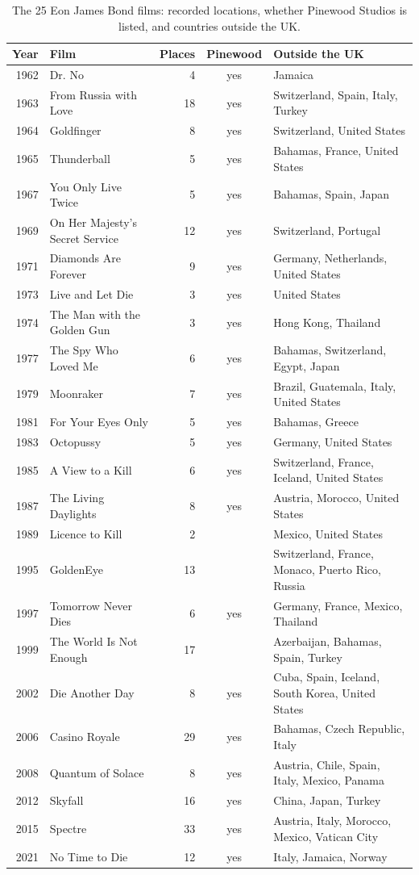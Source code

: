 \documentclass[11pt,a4paper]{article}
\begin{document}
\begin{table}[tbp]\centering\footnotesize\caption{The 25 Eon James Bond films: recorded locations, whether Pinewood Studios is listed, and countries outside the UK.}\label{tab:bond}\begin{tabular}{rlrc>{\raggedright\arraybackslash}p{6.4cm}}\toprule Year & Film & Places & Pinewood & Outside the UK\\\midrule
1962 & Dr. No & 4 & yes & Jamaica\\
1963 & From Russia with Love & 18 & yes & Switzerland, Spain, Italy, Turkey\\
1964 & Goldfinger & 8 & yes & Switzerland, United States\\
1965 & Thunderball & 5 & yes & Bahamas, France, United States\\
1967 & You Only Live Twice & 5 & yes & Bahamas, Spain, Japan\\
1969 & On Her Majesty's Secret Service & 12 & yes & Switzerland, Portugal\\
1971 & Diamonds Are Forever & 9 & yes & Germany, Netherlands, United States\\
1973 & Live and Let Die & 3 & yes & United States\\
1974 & The Man with the Golden Gun & 3 & yes & Hong Kong, Thailand\\
1977 & The Spy Who Loved Me & 6 & yes & Bahamas, Switzerland, Egypt, Japan\\
1979 & Moonraker & 7 & yes & Brazil, Guatemala, Italy, United States\\
1981 & For Your Eyes Only & 5 & yes & Bahamas, Greece\\
1983 & Octopussy & 5 & yes & Germany, United States\\
1985 & A View to a Kill & 6 & yes & Switzerland, France, Iceland, United States\\
1987 & The Living Daylights & 8 & yes & Austria, Morocco, United States\\
1989 & Licence to Kill & 2 &  & Mexico, United States\\
1995 & GoldenEye & 13 &  & Switzerland, France, Monaco, Puerto Rico, Russia\\
1997 & Tomorrow Never Dies & 6 & yes & Germany, France, Mexico, Thailand\\
1999 & The World Is Not Enough & 17 &  & Azerbaijan, Bahamas, Spain, Turkey\\
2002 & Die Another Day & 8 & yes & Cuba, Spain, Iceland, South Korea, United States\\
2006 & Casino Royale & 29 & yes & Bahamas, Czech Republic, Italy\\
2008 & Quantum of Solace & 8 & yes & Austria, Chile, Spain, Italy, Mexico, Panama\\
2012 & Skyfall & 16 & yes & China, Japan, Turkey\\
2015 & Spectre & 33 & yes & Austria, Italy, Morocco, Mexico, Vatican City\\
2021 & No Time to Die & 12 & yes & Italy, Jamaica, Norway\\
\bottomrule\end{tabular}\end{table}
\end{document}
